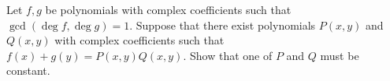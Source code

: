Let $f,g$ be polynomials with complex coefficients such that $\gcd(\deg f,\deg g)=1$. Suppose that there exist polynomials $P(x,y)$ and $Q(x,y)$ with complex coefficients such that $f(x)+g(y)=P(x,y)Q(x,y)$. Show that one of $P$ and $Q$ must be constant.
